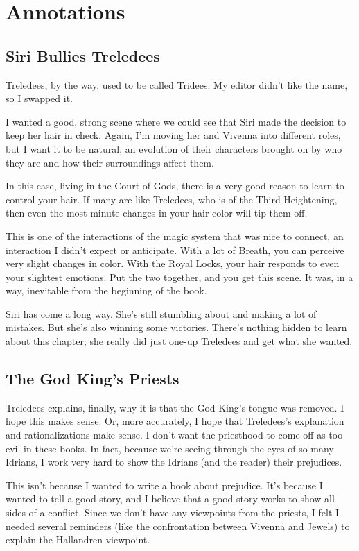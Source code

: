 \section*{Annotations}

\subsection*{Siri Bullies Treledees}

Treledees, by the way, used to be called Tridees. My editor didn’t like the name, so I swapped it.

I wanted a good, strong scene where we could see that Siri made the decision to keep her hair in check. Again, I’m moving her and Vivenna into different roles, but I want it to be natural, an evolution of their characters brought on by who they are and how their surroundings affect them.

In this case, living in the Court of Gods, there is a very good reason to learn to control your hair. If many are like Treledees, who is of the Third Heightening, then even the most minute changes in your hair color will tip them off.

This is one of the interactions of the magic system that was nice to connect, an interaction I didn’t expect or anticipate. With a lot of Breath, you can perceive very slight changes in color. With the Royal Locks, your hair responds to even your slightest emotions. Put the two together, and you get this scene. It was, in a way, inevitable from the beginning of the book.

Siri has come a long way. She’s still stumbling about and making a lot of mistakes. But she’s also winning some victories. There’s nothing hidden to learn about this chapter; she really did just one-up Treledees and get what she wanted.

\subsection*{The God King’s Priests}

Treledees explains, finally, why it is that the God King’s tongue was removed. I hope this makes sense. Or, more accurately, I hope that Treledees’s explanation and rationalizations make sense. I don’t want the priesthood to come off as too evil in these books. In fact, because we’re seeing through the eyes of so many Idrians, I work very hard to show the Idrians (and the reader) their prejudices.

This isn’t because I wanted to write a book about prejudice. It’s because I wanted to tell a good story, and I believe that a good story works to show all sides of a conflict. Since we don’t have any viewpoints from the priests, I felt I needed several reminders (like the confrontation between Vivenna and Jewels) to explain the Hallandren viewpoint.



